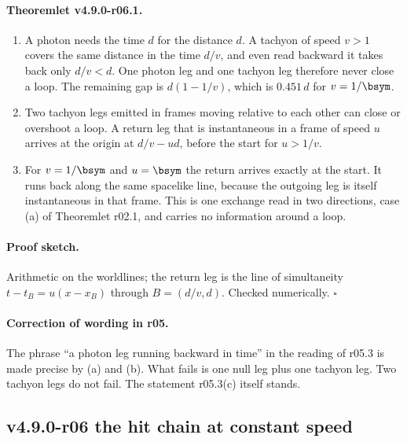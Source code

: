 \paragraph{Theoremlet v4.9.0-r06.1.}
\begin{enumerate}[leftmargin=2em]
\item[(a)] A photon needs the time \(d\) for the distance \(d\).  A tachyon of speed \(v>1\) covers the same distance in the
time \(d/v\), and even read backward it takes back only \(d/v<d\).  One photon leg and one tachyon leg therefore never close
a loop.  The remaining gap is \(d(1-1/v)\), which is \(0.451\,d\) for \(v=1/\bsym\).
\item[(b)] Two tachyon legs emitted in frames moving relative to each other can close or overshoot a loop.  A return leg
that is instantaneous in a frame of speed \(u\) arrives at the origin at \(d/v-ud\), before the start for \(u>1/v\).
\item[(c)] For \(v=1/\bsym\) and \(u=\bsym\) the return arrives exactly at the start.  It runs back along the same
spacelike line, because the outgoing leg is itself instantaneous in that frame.  This is one exchange read in two
directions, case (a) of Theoremlet r02.1, and carries no information around a loop.
\end{enumerate}

\paragraph{Proof sketch.}
Arithmetic on the worldlines; the return leg is the line of simultaneity \(t-t_B=u(x-x_B)\) through
\(B=(d/v,d)\).  Checked numerically.  \(\square\)

\paragraph{Correction of wording in r05.}
The phrase ``a photon leg running backward in time'' in the reading of r05.3 is made precise by (a) and (b).  What fails
is one null leg plus one tachyon leg.  Two tachyon legs do not fail.  The statement r05.3(c) itself stands.

\subsection*{v4.9.0-r06 the hit chain at constant speed}
\label{subsec:v490-r06-chain}

